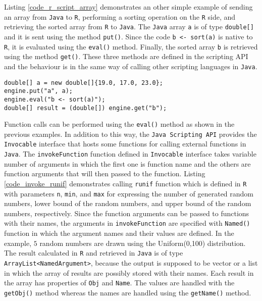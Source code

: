 \documentclass[10pt,a4paper, final, oneside]{article}
\begin{document}
Listing \ref{code_r_script_array} demonstrates an other simple example of sending an array from \texttt{Java} to \texttt{R}, performing a sorting operation on the \texttt{R} side, and retrieving the sorted array from \texttt{R} to \texttt{Java}. The \texttt{Java} array \texttt{a} is of type \texttt{double[]} and it is sent using the method \texttt{put()}. Since the code \texttt{b <- sort(a)} is native to \texttt{R}, it is evaluated using the \texttt{eval()} method. Finally, the sorted array \texttt{b} is retrieved using the method \texttt{get()}. These three methods are defined in the scripting API and the behaviour is in the same way of calling other scripting languages in \texttt{Java}. 

\begin{minipage}{\linewidth}
\begin{lstlisting}[caption=Passing Java Arrays,label=code_r_script_array]
double[] a = new double[]{19.0, 17.0, 23.0};
engine.put("a", a);
engine.eval("b <- sort(a)");        
double[] result = (double[]) engine.get("b");
\end{lstlisting}
\end{minipage}

Function calls can be performed using the \texttt{eval()} method as shown in the previous examples. In addition to this way, the \texttt{Java Scripting API} provides the \texttt{Invocable} interface that hosts some functions for calling external functions in \texttt{Java}. The \texttt{invokeFunction} function defined in \texttt{Invocable} interface takes variable number of arguments in which the first one is function name and the others are function arguments that will then passed to the function. Listing \ref{code_invoke_runif} demonstrates calling \texttt{runif} function which is defined in \texttt{R} with parameters \texttt{n}, \texttt{min}, and \texttt{max} for expressing the number of generated random numbers, lower bound of the random numbers, and upper bound of the random numbers, respectively. Since the function arguments can be passed to functions with their names, the arguments in \texttt{invokeFunction} are specified with \texttt{Named()} function in which the argument names and their values are defined. In the example, $5$ random numbers are drawn using the Uniform(0,100) distribution. The result calculated in \texttt{R} and retrieved in \texttt{Java} is of type \texttt{ArrayList<NamedArgument>}, because the output is supposed to be vector or a list in which the array of results are possibly stored with their names. Each result in the array has properties of \texttt{Obj} and \texttt{Name}. The values are handled with the \texttt{getObj()} method whereas the names are handled using the \texttt{getName()} method.
\end{document}
